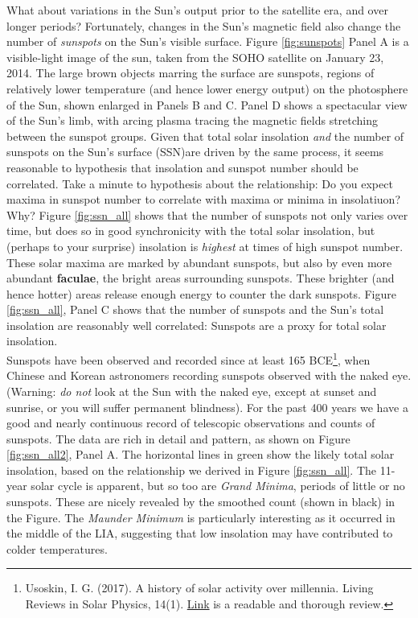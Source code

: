What about variations in the Sun's output prior to the satellite era, and over longer periods? Fortunately, changes in the Sun's magnetic field also change the number of \emph{sunspots} on the Sun's visible surface. Figure \ref{fig:sunspots} Panel A is a visible-light image of the sun, taken from the SOHO satellite on January 23, 2014. The large brown objects marring the surface are sunspots, regions of relatively lower temperature (and hence lower energy output) on the photosphere of the Sun, shown enlarged in Panels B and C. Panel D shows a spectacular view of the Sun's limb, with arcing plasma tracing the magnetic fields stretching between the sunspot groups. Given that total solar insolation \textit{and} the number of sunspots on the Sun's surface (SSN)are driven by the same process, it seems reasonable to hypothesis that insolation and sunspot number should be correlated. Take a minute to hypothesis about the relationship: Do you expect maxima in sunspot number to correlate with maxima or minima in insolatiuon? Why? Figure \ref{fig:ssn_all} shows that the number of sunspots not only varies over time, but does so in good synchronicity with the total solar insolation, but (perhaps to your surprise) insolation is \textit{highest} at times of high sunspot number. These solar maxima are marked by abundant sunspots, but also by even more abundant \textbf{faculae}, the bright areas surrounding sunspots. These brighter (and hence hotter) areas release enough energy to counter the dark sunspots. Figure \ref{fig:ssn_all}, Panel C shows that the number of sunspots and the Sun's total insolation are reasonably well correlated: Sunspots are a proxy for total solar insolation.\\

Sunspots have been observed and recorded since at least 165 BCE\footnote{Usoskin, I. G. (2017). A history of solar activity over millennia. Living Reviews in Solar Physics, 14(1). \href{https://doi.org/10.1007/s41116-017-0006-9}{Link} is a readable and thorough review.}, when Chinese and Korean astronomers recording sunspots observed with the naked eye. (Warning: \emph{do not} look at the Sun with the naked eye, except at sunset and sunrise, or you will suffer permanent blindness). For the past 400 years we have a good and nearly continuous record of telescopic observations and counts of sunspots. The data are rich in detail and pattern, as shown on Figure \ref{fig:ssn_all2}, Panel A. The horizontal lines in green show the likely total solar insolation, based on the relationship we derived in Figure \ref{fig:ssn_all}. The 11-year solar cycle is apparent, but so too are \textit{Grand Minima}, periods of little or no sunspots. These are nicely revealed by the smoothed count (shown in black) in the Figure.  The \emph{Maunder Minimum} is particularly interesting as it occurred in the middle of the LIA, suggesting that low insolation may have contributed to colder temperatures. \\

